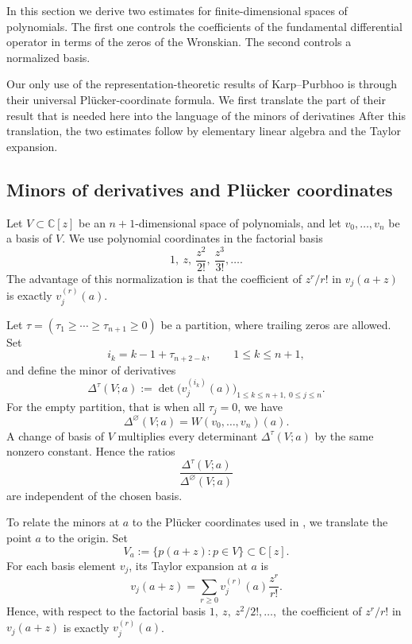 \documentclass[12pt,letterpaper,reqno]{amsart}
\theoremstyle{definition}
\numberwithin{equation}{section}
\newcommand{\C}{\mathbb C}
\begin{document}
In this section we derive two estimates for finite-dimensional spaces of
polynomials. The first one controls the coefficients of the fundamental
differential operator in terms of the zeros of the Wronskian. The second
controls a normalized basis. 

Our only use of the representation-theoretic results of Karp--Purbhoo
\cite{KP26} is through their universal Pl\"ucker-coordinate formula.
We first translate the part of their
result that is needed here into the language of the minors of derivatines
After
this translation, the two estimates follow by elementary linear algebra
and the Taylor expansion.

\subsection{Minors of derivatives and Pl\"ucker coordinates}
\label{sec:derivative-minors}

Let \(V\subset\C[z]\) be an \({n+1}\)-dimensional space of polynomials, and
let \(v_0,\ldots,v_{n}\) be a basis of \(V\). We use polynomial
coordinates in the factorial basis
\[
1,\ z,\ \frac{z^2}{2!},\ \frac{z^3}{3!},\ldots.
\]
The advantage of this normalization is that the coefficient of
\(z^r/r!\) in \(v_j(a+z)\) is exactly \(v_j^{(r)}(a)\).

Let
$
\tau=(\tau_1\geq\cdots\geq\tau_{n+1}\geq0)
$
be a partition, where trailing zeros are allowed. Set
\[
i_k=k-1+\tau_{n+2-k},
\qquad 1\leq k\leq n+1,
\]
and define the minor of derivatives
\begin{equation}\label{eq:derivative-minor}
 \Delta^\tau(V;a)
 :=
 \det\bigl(v_j^{(i_k)}(a)\bigr)_{
                  1\leq k\leq n+1,\ 0\leq j\leq n}.
\end{equation}
For the empty partition, that is when all $\tau_j=0$, we have
\[
\Delta^\varnothing(V;a)
=
W(v_0,\ldots,v_{n})(a).
\]
A change of basis of \(V\) multiplies every determinant
\(\Delta^\tau(V;a)\) by the same nonzero constant. Hence the ratios
\[
\frac{\Delta^\tau(V;a)}
     {\Delta^\varnothing(V;a)}
\]
are independent of the chosen basis.

To relate the minors at \(a\) to the Pl\"ucker coordinates
used in \cite{KP26}, we translate the point \(a\) to the origin. Set
\[
V_a:=\{p(a+z):p\in V\}\subset\C[z].
\]
For each basis element \(v_j\), its Taylor expansion at \(a\) is
\[
v_j(a+z)
=
\sum_{r\geq0}v_j^{(r)}(a)\frac{z^r}{r!}.
\]
Hence, with respect to the factorial basis
$
1,\ z,\ {z^2}/{2!},\ldots,
$
the coefficient of \(z^r/r!\) in \(v_j(a+z)\) is exactly
\(v_j^{(r)}(a)\).
\end{document}
